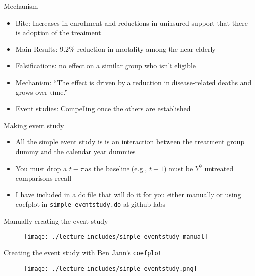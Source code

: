 \documentclass{beamer}
\begin{document}
\begin{frame}{Mechanism}

\begin{itemize}
\item Bite: Increases in enrollment and reductions in uninsured support that there is adoption of the treatment
\item Main Results: 9.2\% reduction in mortality among the near-elderly
\item Falsifications: no effect on a similar group who isn't eligible
\item Mechanism: ``The effect is driven by a reduction in disease-related deaths and grows over time.''
\item Event studies: Compelling once the others are established
\end{itemize}

\end{frame}

\begin{frame}{Making event study}

\begin{itemize}
\item All the simple event study is is an interaction between the treatment group dummy and the calendar year dummies
\item You must drop a $t-\tau$ as the baseline (e.g., $t-1$) must be $Y^0$ untreated comparisons recall
\item I have included in a do file that will do it for you either manually or using coefplot in \texttt{simple\_eventstudy.do} at github labs
\end{itemize}

\end{frame}


\begin{frame}{Manually creating the event study}

	\begin{figure}
	\texttt{[image: ./lecture\_includes/simple\_eventstudy\_manual]}
	\end{figure}

\end{frame}




\begin{frame}{Creating the event study with Ben Jann's \texttt{coefplot}}

	\begin{figure}
	\texttt{[image: ./lecture\_includes/simple\_eventstudy.png]}
	\end{figure}

\end{frame}
\end{document}

